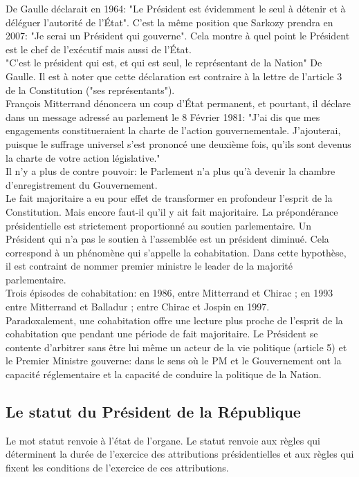 \documentclass[12pt, a4paper, openany]{book}
\begin{document}
De Gaulle déclarait en 1964: "Le Président est évidemment le seul à détenir et à déléguer l'autorité de l'État". C'est la même position que Sarkozy prendra en 2007: "Je serai un Président qui gouverne". Cela montre à quel point le Président est le chef de l'exécutif mais aussi de l'État. \\
"C'est le président qui est, et qui est seul, le représentant de la Nation" De Gaulle. Il est à noter que cette déclaration est contraire à la lettre de l'article 3 de la Constitution ("ses représentants"). \\
François Mitterrand dénoncera un coup d'État permanent, et pourtant, il déclare dans un message adressé au parlement le 8 Février 1981: "J'ai dis que mes engagements constitueraient la charte de l'action gouvernementale. J'ajouterai, puisque le suffrage universel s'est prononcé une deuxième fois, qu'ils sont devenus la charte de votre action législative." \\
Il n'y a plus de contre pouvoir: le Parlement n'a plus qu'à devenir la chambre d'enregistrement du Gouvernement. \\
Le fait majoritaire a eu pour effet de transformer en profondeur l'esprit de la Constitution. Mais encore faut-il qu'il y ait fait majoritaire. La prépondérance présidentielle est strictement proportionné au soutien parlementaire. Un Président qui n'a pas le soutien à l'assemblée est un président diminué. Cela correspond à un phénomène qui s'appelle la cohabitation. Dans cette hypothèse, il est contraint de nommer premier ministre le leader de la majorité parlementaire. \\
Trois épisodes de cohabitation: en 1986, entre Mitterrand et Chirac ; en 1993 entre Mitterrand et Balladur ; entre Chirac et Jospin en 1997. \\
Paradoxalement, une cohabitation offre une lecture plus proche de l'esprit de la cohabitation que pendant une période de fait majoritaire. Le Président se contente d'arbitrer sans être lui même un acteur de la vie politique (article 5) et le Premier Ministre gouverne: dans le sens où le PM et le Gouvernement ont la capacité réglementaire et la capacité de conduire la politique de la Nation.


\subsection{Le statut du Président de la République}

Le mot statut renvoie à l'état de l'organe. Le statut renvoie aux règles qui déterminent la durée de l'exercice des attributions présidentielles et aux règles qui fixent les conditions de l'exercice de ces attributions.
\end{document}
